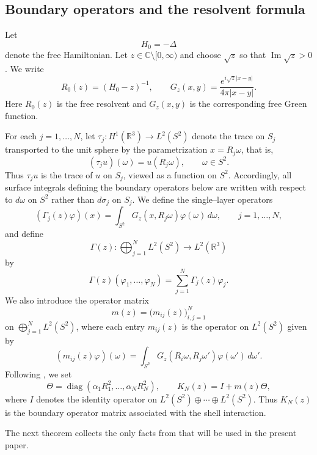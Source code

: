 \documentclass[a4paper,11pt]{article}
\numberwithin{equation}{section}
\newcommand{\R}{\mathbb{R}}
\newcommand{\C}{\mathbb{C}}
\newcommand{\diag}{\operatorname{diag}}
\renewcommand{\Im}{\operatorname{Im}}
\theoremstyle{definition}
\theoremstyle{remark}
\begin{document}
\subsection{Boundary operators and the resolvent formula}

Let
$$
H_0=-\Delta
$$
denote the free Hamiltonian. Let $z\in\C\setminus[0,\infty)$ and choose
$\sqrt{z}$ so that $\Im\sqrt{z}>0$. We write
$$
R_0(z)=(H_0-z)^{-1},
\qquad
G_z(x,y)=\frac{e^{i\sqrt{z}|x-y|}}{4\pi|x-y|}.
$$
Here $R_0(z)$ is the free resolvent and $G_z(x,y)$ is the corresponding free
Green function.

For each $j=1,\ldots,N$, let $\tau_j:H^1(\R^3)\to L^2(S^2)$ denote the trace
on $S_j$ transported to the unit sphere by the parametrization $x=R_j\omega$,
that is,
$$
(\tau_j u)(\omega)=u(R_j\omega),
\qquad
\omega\in S^2.
$$
Thus $\tau_j u$ is the trace of $u$ on $S_j$, viewed as a function on $S^2$.
Accordingly, all surface integrals defining the boundary operators below are
written with respect to $d\omega$ on $S^2$ rather than $d\sigma_j$ on $S_j$.
We define the single--layer operators
$$
(\Gamma_j(z)\varphi)(x)
=
\int_{S^2}G_z(x,R_j\omega)\varphi(\omega)\,d\omega,
\qquad
j=1,\ldots,N,
$$
and define
$$
\Gamma(z):\bigoplus_{j=1}^N L^2(S^2)\to L^2(\R^3)
$$
by
$$
\Gamma(z)(\varphi_1,\ldots,\varphi_N)
=
\sum_{j=1}^N \Gamma_j(z)\varphi_j.
$$
We also introduce the operator matrix
$$
m(z)=\bigl(m_{ij}(z)\bigr)_{i,j=1}^N
$$
on $\bigoplus_{j=1}^N L^2(S^2)$, where each entry
$m_{ij}(z)$ is the operator on $L^2(S^2)$ given by
$$
(m_{ij}(z)\varphi)(\omega)
=
\int_{S^2}G_z(R_i\omega,R_j\omega')\varphi(\omega')\,d\omega'.
$$
Following \cite{KaminagaAAMP2026}, we set
\begin{equation}\label{eq:Theta}
\Theta=\diag(\alpha_1R_1^2,\ldots,\alpha_NR_N^2),
\qquad
K_N(z)=I+m(z)\Theta,
\end{equation}
where $I$ denotes the identity operator on
$L^2(S^2)\oplus\cdots\oplus L^2(S^2)$. Thus $K_N(z)$ is the boundary
operator matrix associated with the shell interaction.

The next theorem collects the only facts from \cite{KaminagaAAMP2026}
that will be used in the present paper.
\end{document}
